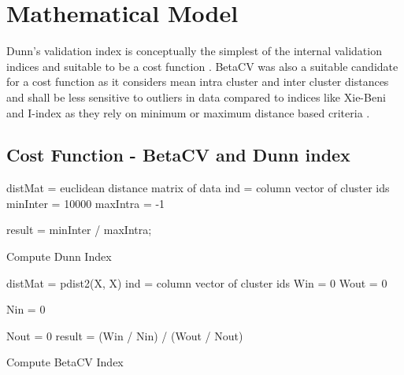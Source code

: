 \documentclass{svproc}
\begin{document}
\section{Mathematical Model}
Dunn's validation index is conceptually the simplest of the internal validation indices and suitable to be a cost function \cite{ppr:12}. BetaCV was also a suitable candidate for a cost function as it considers mean intra cluster and inter cluster distances and shall be less sensitive to outliers in data compared to indices like Xie-Beni and I-index as they rely on minimum or maximum distance based criteria \cite{ppr:11}.

\subsection{Cost Function - BetaCV and Dunn index}

\begin{algorithm}[H]
 distMat = euclidean distance matrix of data\;
 ind = column vector of cluster ids\;
 minInter = 10000\;
 maxIntra = -1\;
 	
  
  result = minInter / maxIntra;
 \caption{Compute Dunn Index}
\end{algorithm}



\begin{algorithm}[H]
 distMat = pdist2(X, X)\;
 ind = column vector of cluster ids\;
 	Win = 0\;
	Wout = 0\;
	
  Nin = 0\;
  
  
  Nout = 0\;
    result = (Win / Nin) / (Wout / Nout)\;
 \caption{Compute BetaCV Index}
\end{algorithm}
\end{document}

